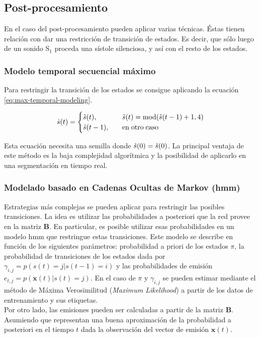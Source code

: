 \subsection*{Post-procesamiento}

\indent En el caso del post-procesamiento pueden aplicar varias técnicas. Éstas tienen relación con dar una restricción de transición de estados. Es decir, que sólo luego de un sonido S$_1$ proceda una sístole silenciosa, y así con el resto de los estados. 

\subsubsection*{Modelo temporal secuencial máximo}

\indent Para restringir la transición de los estados se consigue aplicando la ecuación \ref{eq:max-temporal-modeling}.

\begin{align} \label{eq:max-temporal-modeling}
    \hat{s}(t) =
    \begin{cases}
        \Tilde{s}(t), \quad &\Tilde{s}(t) = \mathrm{mod}(\hat{s}(t-1)+1, 4)\\
        \hat{s}(t-1), \quad &\mathrm{en\;otro\;caso}
    \end{cases}
\end{align}

\indent Esta ecuación necesita una semilla donde $\hat{s}(0) = \Tilde{s}(0)$. La principal ventaja de este método es la baja complejidad algorítmica y la posibilidad de aplicarlo en una segmentación en tiempo real. 

\subsubsection*{Modelado basado en Cadenas Ocultas de Markov (\acrshort{hmm})}

\indent Estrategias más complejas se pueden aplicar para restringir las posibles transiciones. La idea es utilizar las probabilidades a posteriori que la red provee en la matriz $\mathbf{B}$. En particular, es posible utilizar esas probabilidades en un modelo \acrshort{hmm} que restringue estas transiciones. Este modelo se describe en función de los siguientes parámetros: probabilidad a priori de los estados $\pi$, la probabilidad de transiciones de los estados dada por $\gamma_{i,j} = p(s(t)=j|s(t-1)=i)$ y las probabilidades de emisión $e_{t,j} = p(\mathbf{x}(t)|s(t) = j)$. En el caso de $\pi$ y $\gamma_{i,j}$ se pueden estimar mediante el método de Máxima Verosimilitud (\textit{Maximum Likelihood}) a partir de los datos de entrenamiento y sus etiquetas. \\
\indent Por otro lado, las emisiones pueden ser calculadas a partir de la matriz $\mathbf{B}$. Asumiendo que representan una buena aproximación de la probabilidad a posteriori en el tiempo $t$ dada la observación del vector de emisión $\mathbf{x}(t)$.

